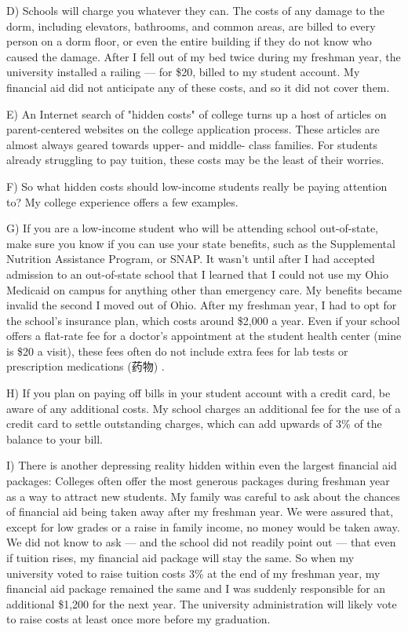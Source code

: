 \documentclass[UTF8,11pt]{ctexart}
\begin{document}
D) Schools will charge you whatever they can. The costs of any damage to the dorm, including elevators, bathrooms, and common areas, are billed to every person on a dorm floor, or even the entire building if they do not know who caused the damage. After I fell out of my bed twice during my freshman year, the university installed a railing — for \$20, billed to my student account. My financial aid did not anticipate any of these costs, and so it did not cover them.


E) An Internet search of "hidden costs" of college turns up a host of articles on parent-centered websites on the college application process. These articles are almost always geared towards upper- and middle- class families. For students already struggling to pay tuition, these costs may be the least of their worries.


F) So what hidden costs should low-income students really be paying attention to? My college experience offers a few examples.


G) If you are a low-income student who will be attending school out-of-state, make sure you know if you can use your state benefits, such as the Supplemental Nutrition Assistance Program, or SNAP. It wasn't until after I had accepted admission to an out-of-state school that I learned that I could not use my Ohio Medicaid on campus for anything other than emergency care. My benefits became invalid the second I moved out of Ohio. After my freshman year, I had to opt for the school's insurance plan, which costs around \$2,000 a year. Even if your school offers a flat-rate fee for a doctor's appointment at the student health center (mine is \$20 a visit), these fees often do not include extra fees for lab tests or prescription medications (药物) .


H) If you plan on paying off bills in your student account with a credit card, be aware of any additional costs. My school charges an additional fee for the use of a credit card to settle outstanding charges, which can add upwards of 3\% of the balance to your bill.


I) There is another depressing reality hidden within even the largest financial aid packages: Colleges often offer the most generous packages during freshman year as a way to attract new students. My family was careful to ask about the chances of financial aid being taken away after my freshman year. We were assured that, except for low grades or a raise in family income, no money would be taken away. We did not know to ask — and the school did not readily point out — that even if tuition rises, my financial aid package will stay the same. So when my university voted to raise tuition costs 3\% at the end of my freshman year, my financial aid package remained the same and I was suddenly responsible for an additional \$1,200 for the next year. The university administration will likely vote to raise costs at least once more before my graduation.
\end{document}
